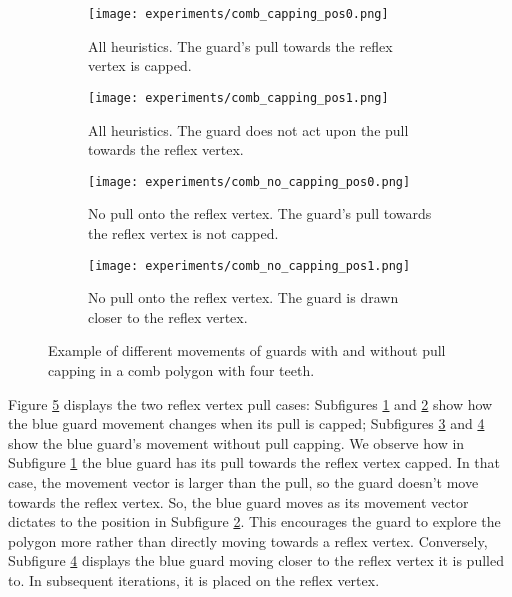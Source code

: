 \begin{figure}[h!]
    \centering
    \begin{subfigure}{0.45\textwidth}
        \texttt{[image: experiments/comb\_capping\_pos0.png]}
        \caption{All heuristics. The guard's pull towards the reflex vertex is capped.}
        \label{fig:all_cap_pos0}
    \end{subfigure}
    \hfill
    \begin{subfigure}{0.45\textwidth}
        \texttt{[image: experiments/comb\_capping\_pos1.png]}
        \caption{All heuristics. The guard does not act upon the pull towards the reflex vertex.}
        \label{fig:all_cap_pos1}
    \end{subfigure}
    \vfill
    \begin{subfigure}{0.45\textwidth}
        \texttt{[image: experiments/comb\_no\_capping\_pos0.png]}
        \caption{No pull onto the reflex vertex. The guard's pull towards the reflex vertex is not capped.}
        \label{fig:no_cap_pos0}
    \end{subfigure}
    \hfill
    \begin{subfigure}{0.45\textwidth}
        \texttt{[image: experiments/comb\_no\_capping\_pos1.png]}
        \caption{No pull onto the reflex vertex. The guard is drawn closer to the reflex vertex.}
        \label{fig:no_cap_pos1}
    \end{subfigure}
    \caption{Example of different movements of guards with and without pull capping in a comb polygon with four teeth.}
    \label{fig:no_cap_eg}
\end{figure}

Figure \ref{fig:no_cap_eg} displays the two reflex vertex pull cases: Subfigures \ref{fig:all_cap_pos0} and \ref{fig:all_cap_pos1} show how the blue guard movement changes when its pull is capped; Subfigures \ref{fig:no_cap_pos0} and \ref{fig:no_cap_pos1} show the blue guard's movement without pull capping. We  observe how in Subfigure \ref{fig:all_cap_pos0} the blue guard has its pull towards the reflex vertex capped. In that case, the movement vector is larger than the pull, so the guard doesn't move towards the reflex vertex. So, the blue guard moves as its movement vector dictates to the position in Subfigure \ref{fig:all_cap_pos1}. This encourages the guard to explore the polygon more rather than directly moving towards a reflex vertex.
Conversely, Subfigure \ref{fig:no_cap_pos1} displays the blue guard moving closer to the reflex vertex it is pulled to. In subsequent iterations, it is placed on the reflex vertex.


